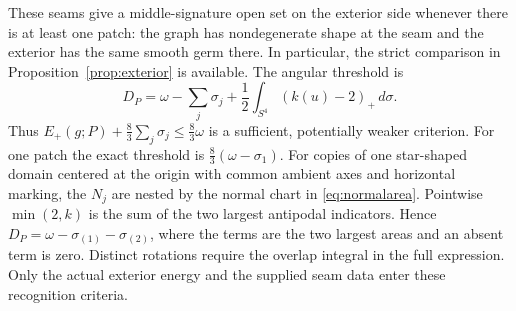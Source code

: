 \documentclass[11pt,letterpaper]{article}
\numberwithin{equation}{section}
\begin{document}
These seams give a middle-signature open set on the exterior
side whenever there is at least one patch: the graph has
nondegenerate shape at the seam and the exterior has the
same smooth germ there. In particular, the strict comparison
in Proposition~\ref{prop:exterior} is available. The angular
threshold is
\[
 D_P=\omega-\sum_j \sigma_j+
                \frac12\int_{S^4}(k(u)-2)_+\,d\sigma .
\]
Thus \(E_+(g;P)+\frac83\sum_j\sigma_j\le\frac83\omega\)
is a sufficient, potentially weaker criterion. For one patch
the exact threshold is \(\frac83(\omega-\sigma_1)\).
For copies of one star-shaped domain centered at the origin
with common ambient axes and horizontal marking, the \(N_j\)
are nested by the normal chart in \eqref{eq:normalarea}.
Pointwise \(\min(2,k)\) is the sum of the two largest antipodal
indicators. Hence \(D_P=\omega-\sigma_{(1)}-\sigma_{(2)}\),
where the terms are the two largest areas and an absent
term is zero. Distinct rotations require the overlap integral
in the full expression. Only the actual exterior energy and
the supplied seam data enter these recognition criteria.
\end{document}
